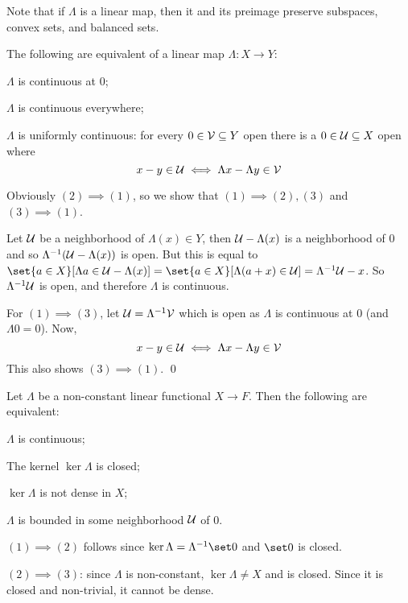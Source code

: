 Note that if $\Lambda$ is a linear map, then it and its preimage preserve subspaces, convex sets, and balanced sets.

\bthrm

    The following are equivalent of a linear map $\Lambda\colon X\to Y$:
    \benum
        \item $\Lambda$ is continuous at $0$;
        \item $\Lambda$ is continuous everywhere;
        \item $\Lambda$ is uniformly continuous: for every $0\in{\cal V}\subseteq Y$ open there is a $0\in{\cal U}\subseteq X$ open where
        $$ x-y\in{\cal U} \iff \Lambda x-\Lambda y\in{\cal V} $$
    \eenum

\ethrm

\bproof

    Obviously $(2)\implies(1)$, so we show that $(1)\implies(2),(3)$ and $(3)\implies(1)$.

    Let ${\cal U}$ be a neighborhood of $\Lambda(x)\in Y$, then ${\cal U}-\Lambda(x)$ is a neighborhood of $0$ and so $\Lambda^{-1}({\cal U}-\Lambda(x))$ is open.
    But this is equal to $\set{a\in X}[\Lambda a\in\U-\Lambda(x)]=\set{a\in X}[\Lambda(a+x)\in\U]=\Lambda^{-1}\U-x$.
    So $\Lambda^{-1}{\cal U}$ is open, and therefore $\Lambda$ is continuous.

    For $(1)\implies(3)$, let ${\cal U}=\Lambda^{-1}{\cal V}$ which is open as $\Lambda$ is continuous at $0$ (and $\Lambda0=0$).
    Now,
    $$ x-y\in{\cal U} \iff \Lambda x-\Lambda y\in{\cal V} $$
    This also shows $(3)\implies(1)$.
    \qed

\eproof

\bthrm

    Let $\Lambda$ be a non-constant linear functional $X\to F$.
    Then the following are equivalent:
    \benum
        \item $\Lambda$ is continuous;
        \item The kernel $\ker\Lambda$ is closed;
        \item $\ker\Lambda$ is not dense in $X$;
        \item $\Lambda$ is bounded in some neighborhood ${\cal U}$ of $0$.
    \eenum

\ethrm

\bproof

    $(1)\implies(2)$ follows since $\ker\Lambda=\Lambda^{-1}\set0$ and $\set0$ is closed.

    $(2)\implies(3)$: since $\Lambda$ is non-constant, $\ker\Lambda\neq X$ and is closed.
    Since it is closed and non-trivial, it cannot be dense.

